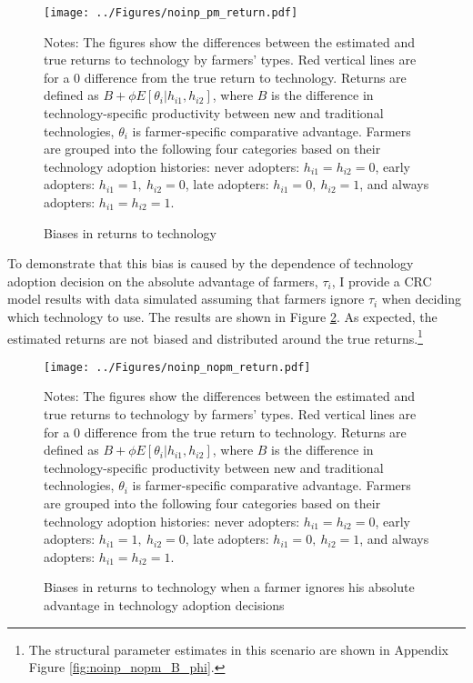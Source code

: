 \documentclass[11pt,letterpaper]{article}
\begin{document}
\begin{figure}[H]
  \centering
  \caption{Biases in returns to technology}
  \texttt{[image: ../Figures/noinp\_pm\_return.pdf]}
  \label{fig:noinp_pm_return}
  \footnotesize
  \begin{tablenotes}
    \item Notes:
      The figures show the differences between the estimated and true returns to technology by farmers' types.
      Red vertical lines are for a 0 difference from the true return to technology.
      Returns are defined as $B + \phi E[\theta_i | h_{i1}, h_{i2}]$, where $B$ is the difference in technology-specific productivity between new and traditional technologies, $\theta_i$ is farmer-specific comparative advantage.
      Farmers are grouped into the following four categories based on their technology adoption histories:
      never adopters: $h_{i1} = h_{i2} = 0$, 
      early adopters: $h_{i1} = 1, \ h_{i2} = 0$, 
      late adopters: $h_{i1} = 0, \ h_{i2} = 1$, and
      always adopters: $h_{i1} = h_{i2} = 1$.
  \end{tablenotes}
\end{figure}

To demonstrate that this bias is caused by the dependence of technology adoption decision on the absolute advantage of farmers, $\tau_i$, I provide a CRC model results with data simulated assuming that farmers ignore $\tau_i$ when deciding which technology to use.
The results are shown in Figure \ref{fig:noinp_nopm_return}.
As expected, the estimated returns are not biased and distributed around the true returns.\footnote{
  The structural parameter estimates in this scenario are shown in Appendix Figure \ref{fig:noinp_nopm_B_phi}.
}

\begin{figure}[H]
  \centering
  \caption{Biases in returns to technology when a farmer ignores his absolute advantage in technology adoption decisions}
  \texttt{[image: ../Figures/noinp\_nopm\_return.pdf]}
  \label{fig:noinp_nopm_return}
  \footnotesize
  \begin{tablenotes}
    \item Notes:
      The figures show the differences between the estimated and true returns to technology by farmers' types.
      Red vertical lines are for a 0 difference from the true return to technology.
      Returns are defined as $B + \phi E[\theta_i | h_{i1}, h_{i2}]$, where $B$ is the difference in technology-specific productivity between new and traditional technologies, $\theta_i$ is farmer-specific comparative advantage.
      Farmers are grouped into the following four categories based on their technology adoption histories:
      never adopters: $h_{i1} = h_{i2} = 0$, 
      early adopters: $h_{i1} = 1, \ h_{i2} = 0$, 
      late adopters: $h_{i1} = 0, \ h_{i2} = 1$, and
      always adopters: $h_{i1} = h_{i2} = 1$.
  \end{tablenotes}
\end{figure}
\end{document}
